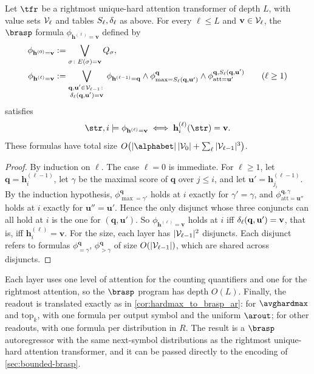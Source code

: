 \begin{theorem} \label{thm:uhat_to_brasp}
Let $\tfr$ be a rightmost unique-hard attention transformer of depth $L$, with value sets
$\mathcal{V}_\ell$ and tables $S_\ell,\delta_\ell$ as above. For every $\ell\leq L$ and
$\mathbf{v}\in\mathcal{V}_\ell$, the $\brasp$ formula $\phi_{\mathbf{h}^{(\ell)}=\mathbf{v}}$ defined by
\begin{align*}
\phi_{\mathbf{h}^{(0)}=\mathbf{v}} &:= \bigvee_{\sigma\colon E(\sigma)=\mathbf{v}}Q_\sigma, \\
\phi_{\mathbf{h}^{(\ell)}=\mathbf{v}} &:= \bigvee_{\substack{\mathbf{q},\mathbf{u}'\in\mathcal{V}_{\ell-1}\colon\\ \delta_\ell(\mathbf{q},\mathbf{u}')=\mathbf{v}}}
\phi_{\mathbf{h}^{(\ell-1)}=\mathbf{q}}\land\phi^{\mathbf{q}}_{\max=S_\ell(\mathbf{q},\mathbf{u}')}\land\phi^{\mathbf{q},S_\ell(\mathbf{q},\mathbf{u}')}_{\mathrm{att}=\mathbf{u}'}
\qquad(\ell\geq1)
\end{align*}
satisfies
\[
\str,i\models\phi_{\mathbf{h}^{(\ell)}=\mathbf{v}}\iff\mathbf{h}^{(\ell)}_i(\str)=\mathbf{v}.
\]
These formulas have total size $O\bigl(|\alphabet|\,|\Vals_0| + \sum_{\ell}|\Vals_{\ell-1}|^3\bigr)$.
\end{theorem}

\begin{proof}
By induction on $\ell$. The case $\ell=0$ is immediate. For $\ell\geq1$, let
$\mathbf{q}=\mathbf{h}^{(\ell-1)}_i$, let $\gamma$ be the maximal score of $\mathbf{q}$ over $j\leq i$, and let
$\mathbf{u}'=\mathbf{h}^{(\ell-1)}_{j_i}$.
By the induction hypothesis, $\phi^{\mathbf{q}}_{\max=\gamma'}$ holds at $i$ exactly for $\gamma'=\gamma$, and
$\phi^{\mathbf{q},\gamma}_{\mathrm{att}=\mathbf{u}''}$ holds at $i$ exactly for $\mathbf{u}''=\mathbf{u}'$.
Hence the only disjunct whose three conjuncts can all hold at $i$ is the one for $(\mathbf{q},\mathbf{u}')$.
So $\phi_{\mathbf{h}^{(\ell)}=\mathbf{v}}$ holds at $i$ iff $\delta_\ell(\mathbf{q},\mathbf{u}')=\mathbf{v}$, that is, iff $\mathbf{h}^{(\ell)}_i=\mathbf{v}$.
For the size, each layer has $|\mathcal{V}_{\ell-1}|^2$ disjuncts. Each disjunct refers to formulas
$\phi^{\mathbf{q}}_{=\gamma}$, $\phi^{\mathbf{q}}_{>\gamma}$ of size $O(|\mathcal{V}_{\ell-1}|)$, which are shared across disjuncts.
\end{proof}

Each layer uses one level of attention for the counting quantifiers and one for the rightmost
attention, so the $\brasp$ program has depth $O(L)$.
Finally, the readout is translated exactly as in \cref{cor:hardmax_to_brasp_ar}: for $\avghardmax$ and $\mathrm{top}_k$,
with one formula per output symbol and the uniform $\arout$; for other readouts, with one formula per distribution in $R$.
The result is a $\brasp$ autoregressor with the same next-symbol distributions as the rightmost
unique-hard attention transformer, and it can be passed directly to the encoding of \cref{sec:bounded-brasp}.